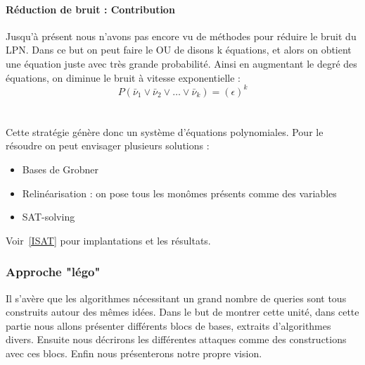\documentclass{article}		%
\theoremstyle{definition}
\theoremstyle{plain}
\theoremstyle{plain}
\theoremstyle{plain}
\theoremstyle{plain}
\begin{document}
\paragraph{Réduction de bruit : Contribution} \hrulefill \label{SAT} 
Jusqu'à présent nous n'avons pas encore vu de méthodes pour réduire le
bruit du LPN. Dans ce but on peut faire le OU de disons k équations, et
alors on obtient une équation juste avec très grande probabilité.
Ainsi en augmentant le degré des équations, on diminue le bruit à
vitesse exponentielle :
 $$P(\bar\nu_1 \vee \bar\nu_2 \vee \dots \vee \bar\nu_k)=(\epsilon)^k$$
\\\\
Cette stratégie génère donc un système d'équations polynomiales. Pour le
résoudre on peut envisager plusieurs solutions :
\begin{itemize}
\item Bases de Grobner
\item Relinéarisation : on pose tous les monômes présents comme des
variables
\item SAT-solving
\end{itemize}
Voir~\ref{ISAT} pour implantations et les résultats.

\subsubsection{Approche "légo"}
Il s'avère que les algorithmes  nécessitant un grand nombre
de queries sont tous construits autour des mêmes idées. Dans le but de
montrer cette unité, dans cette partie nous allons présenter différents
blocs de bases, extraits d'algorithmes divers. Ensuite nous décrirons les
différentes attaques comme des constructions avec ces blocs. Enfin nous
présenterons notre propre vision.  
\end{document}
